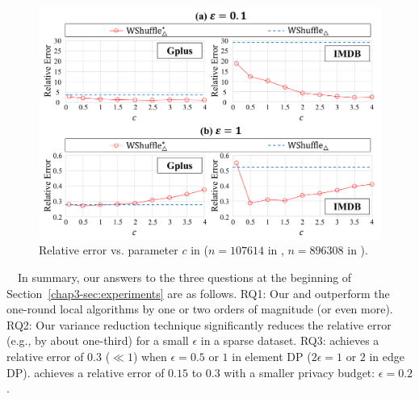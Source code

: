 \begin{figure}[t]
  \centering
  \includegraphics[width=0.99\linewidth]{fig/res4_thr.pdf}
  
  \caption[Relative error vs. parameter $c$ in \AlgWSTriVR{}.]{Relative error vs. parameter $c$ in \AlgWSTriVR{} ($n=107614$ in \Gplus{}, $n=896308$ in \IMDB{}).
  }
  \label{chap3-fig:res4_thr}
\end{figure}

\smallskip
{}~~In summary, our answers to the three questions at the beginning of Section~\ref{chap3-sec:experiments} are as follows. 
RQ1: Our \AlgWSTriVR{} and \AlgWSCyc{} outperform the one-round local algorithms by one or two orders of magnitude (or even more). 
RQ2: Our variance reduction technique significantly reduces the relative error (e.g., by about one-third) 
for a small $\epsilon$ in a sparse dataset. 
RQ3: 
\AlgWSTriVR{} achieves a relative error of $0.3$ ($\ll 1$) when $\epsilon=0.5$ or $1$ in element DP ($2\epsilon=1$ or $2$ in edge DP). 
\AlgWSCyc{} achieves a relative error of $0.15$ to $0.3$ with a smaller privacy budget: $\epsilon=0.2$. 
